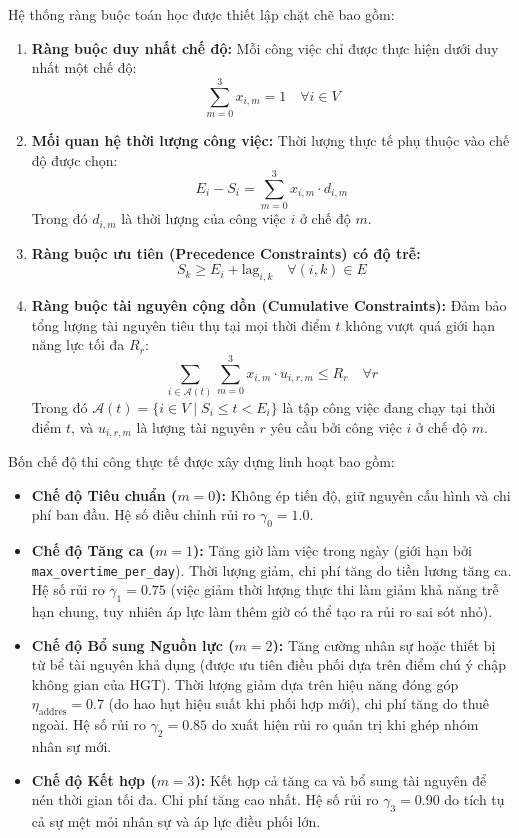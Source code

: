 Hệ thống ràng buộc toán học được thiết lập chặt chẽ bao gồm:
\begin{enumerate}
    \item \textbf{Ràng buộc duy nhất chế độ:} Mỗi công việc chỉ được thực hiện dưới duy nhất một chế độ:
    \begin{equation}
        \sum_{m=0}^{3} x_{i,m} = 1 \quad \forall i \in V
    \end{equation}
    \item \textbf{Mối quan hệ thời lượng công việc:} Thời lượng thực tế phụ thuộc vào chế độ được chọn:
    \begin{equation}
        E_i - S_i = \sum_{m=0}^{3} x_{i,m} \cdot d_{i,m}
    \end{equation}
    Trong đó $d_{i,m}$ là thời lượng của công việc $i$ ở chế độ $m$.
    \item \textbf{Ràng buộc ưu tiên (Precedence Constraints) có độ trễ:}
    \begin{equation}
        S_k \ge E_i + \text{lag}_{i,k} \quad \forall (i, k) \in E
    \end{equation}
    \item \textbf{Ràng buộc tài nguyên cộng dồn (Cumulative Constraints):} Đảm bảo tổng lượng tài nguyên tiêu thụ tại mọi thời điểm $t$ không vượt quá giới hạn năng lực tối đa $R_r$:
    \begin{equation}
        \sum_{i \in \mathcal{A}(t)} \sum_{m=0}^{3} x_{i,m} \cdot u_{i,r,m} \le R_r \quad \forall r
    \end{equation}
    Trong đó $\mathcal{A}(t) = \{i \in V \mid S_i \le t < E_i\}$ là tập công việc đang chạy tại thời điểm $t$, và $u_{i,r,m}$ là lượng tài nguyên $r$ yêu cầu bởi công việc $i$ ở chế độ $m$.
\end{enumerate}

Bốn chế độ thi công thực tế được xây dựng linh hoạt bao gồm:
\begin{itemize}
    \item \textbf{Chế độ Tiêu chuẩn ($m=0$):} Không ép tiến độ, giữ nguyên cấu hình và chi phí ban đầu. Hệ số điều chỉnh rủi ro $\gamma_0 = 1.0$.
    \item \textbf{Chế độ Tăng ca ($m=1$):} Tăng giờ làm việc trong ngày (giới hạn bởi \texttt{max\_overtime\_per\_day}). Thời lượng giảm, chi phí tăng do tiền lương tăng ca. Hệ số rủi ro $\gamma_1 = 0.75$ (việc giảm thời lượng thực thi làm giảm khả năng trễ hạn chung, tuy nhiên áp lực làm thêm giờ có thể tạo ra rủi ro sai sót nhỏ).
    \item \textbf{Chế độ Bổ sung Nguồn lực ($m=2$):} Tăng cường nhân sự hoặc thiết bị từ bể tài nguyên khả dụng (được ưu tiên điều phối dựa trên điểm chú ý chập không gian của HGT). Thời lượng giảm dựa trên hiệu năng đóng góp $\eta_{\text{addres}} = 0.7$ (do hao hụt hiệu suất khi phối hợp mới), chi phí tăng do thuê ngoài. Hệ số rủi ro $\gamma_2 = 0.85$ do xuất hiện rủi ro quản trị khi ghép nhóm nhân sự mới.
    \item \textbf{Chế độ Kết hợp ($m=3$):} Kết hợp cả tăng ca và bổ sung tài nguyên để nén thời gian tối đa. Chi phí tăng cao nhất. Hệ số rủi ro $\gamma_3 = 0.90$ do tích tụ cả sự mệt mỏi nhân sự và áp lực điều phối lớn.
\end{itemize}


